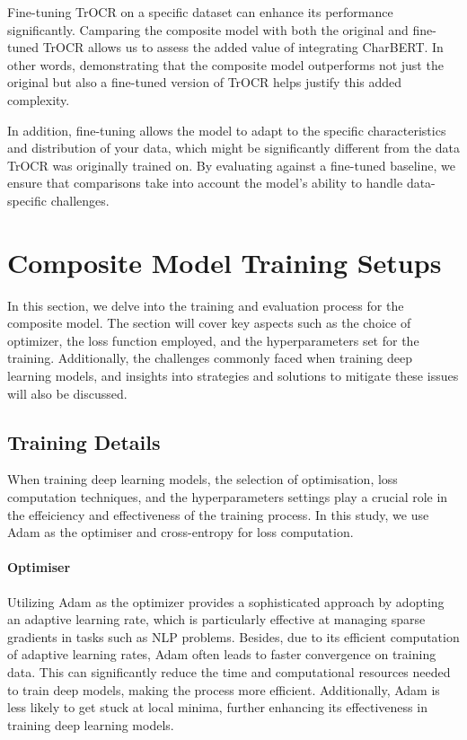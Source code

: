 Fine-tuning TrOCR on a specific dataset can enhance its performance significantly. Camparing the composite model with both the original and fine-tuned TrOCR allows us to assess the added value of integrating CharBERT. In other words, demonstrating that the composite model outperforms not just the original but also a fine-tuned version of TrOCR helps justify this added complexity. 

In addition, fine-tuning allows the model to adapt to the specific characteristics and distribution of your data, which might be significantly different from the data TrOCR was originally trained on. By evaluating against a fine-tuned baseline, we ensure that comparisons take into account the model's ability to handle data-specific challenges.
\section{Composite Model Training Setups}
\label{sec:4_model_training_process}
In this section, we delve into the training and evaluation process for the composite model. The section will cover key aspects such as the choice of optimizer, the loss function employed, and the hyperparameters set for the training. Additionally, the challenges commonly faced when training deep learning models, and insights into strategies and solutions to mitigate these issues will also be discussed.
\subsection{Training Details}
\label{subsec:4_training_details}
When training deep learning models, the selection of optimisation, loss computation techniques, and the hyperparameters settings play a crucial role in the effeiciency and effectiveness of the training process. In this study, we use Adam \citep{Kingma2014AdamAM} as the optimiser and cross-entropy for loss computation.

\paragraph*{Optimiser}
\label{par:4_Optimiser}
Utilizing Adam as the optimizer provides a sophisticated approach by adopting an adaptive learning rate, which is particularly effective at managing sparse gradients in tasks such as NLP problems. Besides, due to its efficient computation of adaptive learning rates, Adam often leads to faster convergence on training data. This can significantly reduce the time and computational resources needed to train deep models, making the process more efficient. Additionally, Adam is less likely to get stuck at local minima, further enhancing its effectiveness in training deep learning models.

